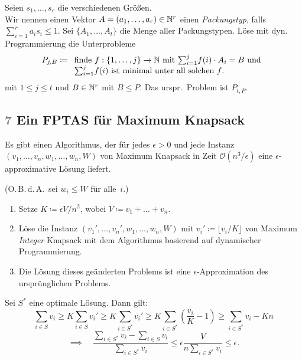 \documentclass{cheat-sheet}
\renewcommand{\O}{\mathcal{O}} %
\newcommand{\floor}[1]{\lfloor #1 \rfloor} %
\newcommand{\Problem}[1]{\textcolor{ProblemColor}{\textbf{#1}}}
\newcommand{\scriptSection}[1]{\textcolor{gray}{#1}\enspace}
\begin{document}
\begin{alg}
  Seien $s_1, \ldots, s_r$ die verschiedenen Größen. \\
  Wir nennen einen Vektor $A = (a_1, \ldots, a_r) \in \mathbb{N}^r$ einen \textit{Packungstyp}, falls ${\sum}_{i=1}^r a_i s_i \leq 1$.
  Sei $\{ A_1, \ldots, A_t \}$ die Menge aller Packungstypen.
  Löse mit dyn. Programmierung die Unterprobleme
  \[
    P_{j,B} \coloneqq
      \begin{array}[t]{l}
        \text{finde $f : \{ 1, \ldots, j \} \to \N$ mit ${\sum}_{i=1}^j f(i) \cdot A_i = B$ und} \\
        \text{${\sum}_{i=1}^j f(i)$ ist minimal unter all solchen $f$.}
      \end{array}
  \]
  mit $1 \leq j \leq t$ und $B \in \mathbb{N}^r$ mit $B \leq P$.
  Das urspr.\ Problem ist $P_{t,P}$.
\end{alg}


\subsection{\scriptSection{7} Ein FPTAS für \Problem{Maximum Knapsack}}

\begin{satz}
  Es gibt einen Algorithmus, der für jedes $\epsilon > 0$ und jede Instanz $(v_1, \ldots, v_n, w_1, \ldots, w_n, W)$ von Maximum Knapsack in Zeit $\O(n^3 / \epsilon)$ eine $\epsilon$-approximative Lösung liefert.
\end{satz}

\begin{alg}
  (O.\,B.\,d.\,A.\ sei $w_i \leq W$ für alle~$i$.)
  \begin{enumerate}
    \item Setze $K \coloneqq \epsilon V / n^2$, wobei $V \coloneqq v_1 + \ldots + v_n$.
    \item Löse die Instanz $(v_1', \ldots, v_n', w_1, \ldots, w_n, W)$ mit $v_i' \coloneqq \floor{v_i/K}$ von Maximum \textit{Integer} Knapsack mit dem Algorithmus basierend auf dynamischer Programmierung.
    \item Die Lösung dieses geänderten Problems ist eine $\epsilon$-Approximation des ursprünglichen Problems.
  \end{enumerate}
\end{alg}

\begin{beweisskizze}
  Sei $S^*$ eine optimale Lösung.
  Dann gilt:
  \[
    \sum_{i \in S} v_i
    \geq K \sum_{i \in S} v_i'
    \geq K \sum_{i \in S^*} v_i'
    \geq K \sum_{i \in S^*} (\frac{v_i}{K} - 1)
    \geq \sum_{i \in S^*} v_i - K n
  \]
  \[
    \implies \quad
    \frac{{\sum}_{i \in S^*} v_i - {\sum}_{i \in S} v_i}{{\sum}_{i \in S^*} v_i}
    \leq \epsilon \frac{V}{n {\sum}_{i \in S^*} v_i}
    \leq \epsilon.
  \]
\end{beweisskizze}
\end{document}
